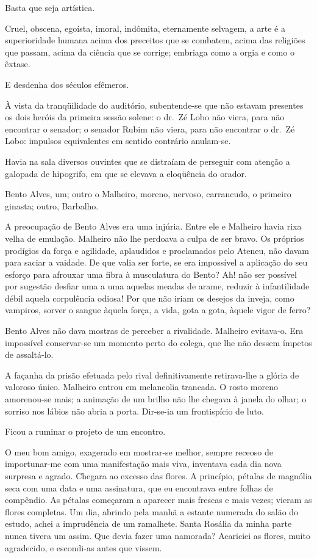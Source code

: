 Basta que seja artística. 

Cruel, obscena, egoísta, imoral, indômita, eternamente selvagem, a arte é a
superioridade humana acima dos preceitos que se combatem, acima das
religiões que passam, acima da ciência que se corrige; embriaga como a
orgia e como o êxtase. 

E desdenha dos séculos efêmeros. 

\noindent\dotfill

À vista da tranqüilidade do auditório, subentende{}-se que não estavam presentes
os dois heróis da primeira sessão solene: o dr.~Zé Lobo não viera, para
não encontrar o senador; o senador Rubim não viera, para não encontrar
o dr.~Zé Lobo: impulsos equivalentes em sentido contrário anulam{}-se.

Havia na sala diversos ouvintes que se distraíam de perseguir com
atenção a galopada de hipogrifo, em que se elevava a eloqüência do
orador. 

Bento Alves, um; outro o Malheiro, moreno, nervoso, carrancudo,
o primeiro ginasta; outro, Barbalho. 

A preocupação de Bento Alves era
uma injúria. Entre ele e Malheiro havia rixa velha de emulação.
Malheiro não lhe perdoava a culpa de ser bravo. Os próprios prodígios
da força e agilidade, aplaudidos e proclamados pelo Ateneu, não davam
para saciar a vaidade. De que valia ser forte, se era impossível a
aplicação do seu esforço para afrouxar uma fibra à musculatura do
Bento? Ah! não ser possível por sugestão desfiar uma a uma aquelas
meadas de arame, reduzir à infantilidade débil aquela corpulência
odiosa! Por que não iriam os desejos da inveja, como vampiros, sorver o
sangue àquela força, a vida, gota a gota, àquele vigor de ferro? 

Bento Alves não dava mostras de perceber a rivalidade. Malheiro evitava{}-o.
Era impossível conservar{}-se um momento perto do colega, que lhe não
dessem ímpetos de assaltá{}-lo. 

A façanha da prisão efetuada pelo rival
definitivamente retirava{}-lhe a glória de valoroso único. Malheiro
entrou em melancolia trancada. O rosto moreno amorenou{}-se mais; a
animação de um brilho não lhe chegava à janela do olhar; o sorriso nos
lábios não abria a porta. Dir{}-se{}-ia um frontispício de luto. 

Ficou a ruminar o projeto de um encontro. 

O meu bom amigo, exagerado em
mostrar{}-se melhor, sempre receoso de importunar{}-me com uma
manifestação mais viva, inventava cada dia nova surpresa e agrado.
Chegara ao excesso das flores. A princípio, pétalas de magnólia seca
com uma data e uma assinatura, que eu encontrava entre folhas de
compêndio. As pétalas começaram a aparecer mais frescas e mais vezes;
vieram as flores completas. Um dia, abrindo pela manhã a estante
numerada do salão do estudo, achei a imprudência de um ramalhete. Santa
Rosália da minha parte nunca tivera um assim. Que devia fazer uma
namorada? Acariciei as flores, muito agradecido, e escondi{}-as antes
que vissem. 

